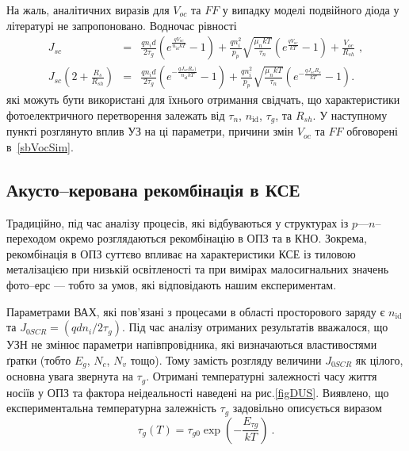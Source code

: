 На жаль, аналітичних виразів для $V_{oc}$ та $F\!F$ у випадку моделі подвійного діода у літературі не запропоновано.
Водночас рівності
\begin{eqnarray}
\label{eqSSCVoc}
 \nonumber J_{sc}&=&\frac{qn_id}{2\tau_{g}}\left(e^{\frac{qV_{oc}}{n_\mathrm{id}kT}}-1\right)
+\frac{qn_i^2}{p_p}\sqrt{\frac{\mu_nkT}{\tau_n}}\left(e^{\frac{qV_{oc}}{kT}}-1\right)+\frac{V_{oc}}{R_{sh}}\,\,,\\
 \nonumber J_{sc}\left(2+\frac{R_s}{R_{sh}}\right)&=&\frac{qn_id}{2\tau_{g}}\left(e^{-\frac{qJ_{sc}R_s)}{n_\mathrm{id}kT}}-1\right)
+\frac{qn_i^2}{p_p}\sqrt{\frac{\mu_nkT}{\tau_n}}\left(e^{-\frac{qJ_{sc}R_s}{kT}}-1\right).
\end{eqnarray}
які можуть бути використані для їхнього отримання свідчать,
що характеристики фотоелектричного перетворення
залежать від $\tau_n$, $n_\mathrm{id}$, $\tau_g$, та $R_{sh}$.
У наступному пункті розглянуто вплив УЗ на ці параметри,
причини змін $V_{oc}$ та  $F\!F$ обговорені в~\ref{sbVocSim}.


\subsection{Акусто--керована рекомбінація в КСЕ\label{sbQNR}}

Традиційно, під час аналізу процесів, які відбуваються у структурах із $p$---$n$--переходом окремо розглядаються рекомбінацію в ОПЗ та в КНО.
Зокрема, рекомбінація в ОПЗ суттєво впливає на характеристики КСЕ із тиловою металізацією при низькій
освітленості та при вимірах малосигнальних значень фото--ерс \cite{Sach:UPJ2016} --- тобто за умов, які відповідають нашим експериментам.


Параметрами ВАХ, які пов'язані з процесами в області просторового заряду є $n_{\mathrm{id}}$ та $J_{0SCR}=(qdn_i/2\tau_{g})$.
Під час аналізу отриманих результатів вважалося, що УЗН не
змінює параметри напівпровідника, які визначаються властивостями ґратки (тобто  $E_g$, $N_c$, $N_v$ тощо).
Тому замість розгляду величини $J_{0SCR}$ як цілого, основна увага звернута на $\tau_{g}$.
Отримані температурні залежності часу життя носіїв у ОПЗ та фактора неідеальності наведені на рис.\ref{figDUS}.
Виявлено, що експериментальна температурна залежність $\tau_{g}$ задовільно описується виразом
\begin{equation}
\label{eq_TAUgT}
    \tau_{g}(T)=\tau_{g0}\exp\left(-\frac{E_{\tau g}}{kT}\right)\:.
\end{equation}

